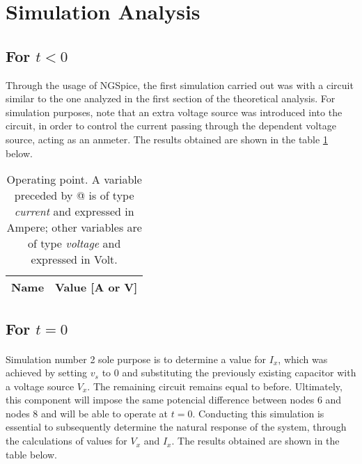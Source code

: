 \newpage{}

\section{Simulation Analysis}
\label{sec:simulation}
\subsection{For $t<0$}

\par Through the usage of NGSpice, the first simulation carried out was with a circuit similar to the one analyzed in the first section of the theoretical analysis. For simulation purposes, note that an extra voltage source was introduced into the circuit, in order to control the current passing through the dependent voltage source, acting as an anmeter. The results obtained are shown in the table \ref{sim1} below.

\begin{table}[H]
  \centering
  \begin{tabular}{|c|c|}
    \hline    
    {\bf Name} & {\bf Value [A or V]} \\ \hline
    
  \end{tabular}
  \caption{Operating point. A variable preceded by @ is of type {\em current}
    and expressed in Ampere; other variables are of type {\it voltage} and expressed in
    Volt.}
  \label{sim1}
\end{table}

\subsection{For $t=0$}
\paragraph{}

\par  Simulation number 2 sole purpose is to determine a value for $I_x$, which was achieved by setting $v_s$ to 0 and substituting the previously existing capacitor with a voltage source $V_x$. The remaining circuit remains equal to before. Ultimately, this component will impose the same potencial difference between nodes 6 and nodes 8 and will be able to operate at $t=0$. Conducting this simulation is essential to subsequently determine the natural response of the system, through the calculations of values for $V_x$ and $I_x$. The results obtained are shown in the table below.

